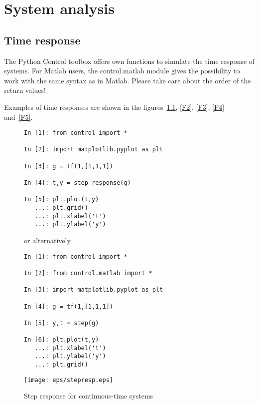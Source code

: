 \chapter{System analysis}

\section{Time response}

The Python Control toolbox offers own functions to simulate the time 
response of systems. For Matlab users, the control.matlab module gives the 
possibility to work with the same syntax as in Matlab.
Please take care about the order of the return values!

Examples of time responses are shown in the figures~\ref{F1}, \ref{F2}, 
\ref{F3}, \ref{F4} and~\ref{F5}.

\begin{figure}[htbp]	%
\begin{minipage}[t]{0.55\textwidth}
  \vspace{0pt}
\begin{lstlisting}[linewidth=7cm, xleftmargin=0cm]
In [1]: from control import *

In [2]: import matplotlib.pyplot as plt

In [3]: g = tf(1,[1,1,1])

In [4]: t,y = step_response(g)

In [5]: plt.plot(t,y)
   ...: plt.grid()
   ...: plt.xlabel('t')
   ...: plt.ylabel('y')

\end{lstlisting}

or alternatively

\begin{lstlisting}[linewidth=7cm,xleftmargin=0cm]
In [1]: from control import *

In [2]: from control.matlab import *

In [3]: import matplotlib.pyplot as plt

In [4]: g = tf(1,[1,1,1])

In [5]: y,t = step(g)

In [6]: plt.plot(t,y)
   ...: plt.xlabel('t')
   ...: plt.ylabel('y')
   ...: plt.grid()
\end{lstlisting}
\end{minipage}%
\begin{minipage}[t]{0.45\textwidth}
  \centering
  \vspace{0.2cm}
  \texttt{[image: eps/stepresp.eps]}
\end{minipage}
\caption{Step response for continuous-time systems}
\label{F1}
\end{figure}


